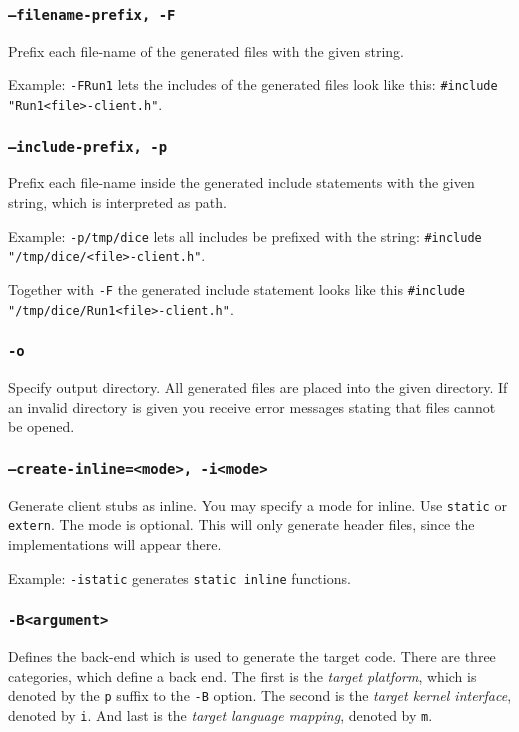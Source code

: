 \subsubsection{{\tt --filename-prefix, -F}}
Prefix each file-name of the \dice{} generated files with the given
string.

Example: \verb|-FRun1| lets the includes of the generated files
look like this: \verb|#include "Run1<file>-client.h"|.

\subsubsection{{\tt --include-prefix, -p}}
Prefix each file-name inside the generated include statements
with the given string, which is interpreted as path.

Example: \verb|-p/tmp/dice| lets all includes be prefixed with
the string: \verb|#include "/tmp/dice/<file>-client.h"|.

Together with \verb|-F| the generated include statement looks like this
\verb|#include "/tmp/dice/Run1<file>-client.h"|.

\subsubsection{{\tt -o}}
Specify output directory. All generated files are placed into the 
given directory. If an invalid directory is given you receive error
messages stating that files cannot be opened.

\subsubsection{{\tt --create-inline=<mode>, -i<mode>}}
Generate client stubs as inline. You may specify a mode for
inline. Use \verb|static| or \verb|extern|. The mode is optional.
This will only generate header files, since the implementations
will appear there.

Example: \verb|-istatic| generates \verb|static inline| functions.

\subsubsection{{\tt -B<argument>}}

Defines the back-end which is used to generate the target code. There are
three categories, which define a back end. The first is the {\it target
platform}, which is denoted by the {\tt p} suffix to the {\tt -B} option.  The
second is the {\it target kernel interface}, denoted by {\tt i}. And last is
the {\it target language mapping}, denoted by {\tt m}.

